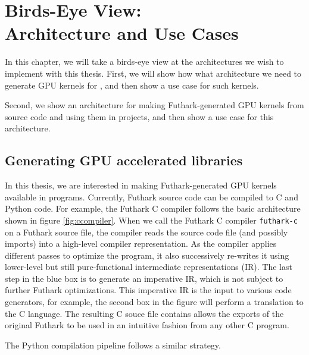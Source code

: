 \chapter{Birds-Eye View:\\Architecture and Use Cases}
In this chapter, we will take a birds-eye view at the architectures we wish to
implement with this thesis.
First, we will show how what architecture we need to
generate GPU kernels for \csharp{}, and then show a use case for such kernels.

Second, we show an architecture for making Futhark-generated GPU kernels from
\fsharp{} source code and using them in \fsharp{} projects, and then show a use
case for this architecture.

\section{Generating GPU accelerated libraries}
In this thesis, we are interested in making Futhark-generated GPU kernels available
in \csharp{} programs.
Currently, Futhark source code can be compiled to C and Python code.
For example, the Futhark C compiler follows the basic architecture shown in
figure \ref{fig:ccompiler}.
When we call the Futhark C compiler \texttt{futhark-c} on a Futhark source file, 
the compiler reads the source code file (and possibly imports) into a high-level
compiler representation.
As the compiler applies different passes to optimize the program, it also 
successively re-writes it using lower-level but still pure-functional 
intermediate representations (IR).  The last step in the blue box is to generate
an imperative IR, which is not subject to further Futhark optimizations.
This imperative IR is the input to various code generators, for example, 
the second box in the figure will perform a translation to the C language.
The resulting C souce file contains allows the exports of the original Futhark 
to be used in an intuitive fashion from any other C program.

The Python compilation pipeline follows a similar strategy.

